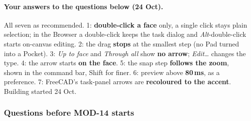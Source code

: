 \paragraph{Your answers to the questions below (24 Oct).} All seven as recommended. 1: \textbf{double-click a face}
only, a single click stays plain selection; in the Browser a double-click keeps the task dialog and
\emph{Alt}-double-click starts on-canvas editing. 2: the drag \textbf{stops} at the smallest step (no Pad turned into a
Pocket). 3: \emph{Up to face} and \emph{Through all} show \textbf{no arrow}; \emph{Edit\ldots} changes the type. 4: the
arrow starts \textbf{on the face}. 5: the snap step \textbf{follows the zoom}, shown in the command bar, Shift for
finer. 6: preview above \textbf{80\,ms}, as a preference. 7: FreeCAD's task-panel arrows are \textbf{recoloured to the
accent}. Building started 24 Oct.

\subsubsection*{Questions before MOD-14 starts}

